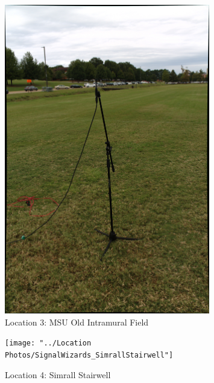 \documentclass[letterpaper, 11pt, onecolumn, oneside]{article}
\begin{document}
\begin{appendix}
\begin{figure}[h!t]
    \includegraphics[width=0.8\textwidth]{"../Location Photos/SignalWizards_OldIntramuralField"}
    \centering
    \caption{Location 3: MSU Old Intramural Field}
\end{figure}

\begin{figure}[h!t]
    \texttt{[image: "../Location Photos/SignalWizards\_SimrallStairwell"]}
    \centering
    \caption{Location 4: Simrall Stairwell}
\end{figure}


\end{appendix}
\end{document}
